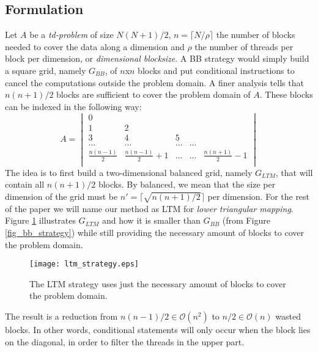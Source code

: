 \documentclass[conference]{IEEEtran}
\begin{document}
\subsection{Formulation}
\label{sec_block_mapping_function}
Let $A$ be a \textit{td-problem} of size $N(N+1)/2$,  $n = \lceil N/\rho\rceil$ the number 
of blocks needed to cover the data along a dimension and $\rho$ the number of threads per block per dimension, or 
\textit{dimensional blocksize}. 
A BB strategy would simply build a square grid, namely $G_{BB}$, of $n$x$n$ blocks and put conditional instructions to cancel the computations 
outside the problem domain. A finer analysis tells that $n(n+1)/2$ blocks are sufficient to cover the problem domain of $A$. 
These blocks can be indexed in the following way:
\begin{equation}
A = 
\begin{vmatrix}
0	&		&		&				&					\\
1	&	2	&		&				&					\\
3	&	4	&	5	&				&					\\	
...	&	... 	&	...	&	...			& 					\\
\frac{n(n-1)}{2}	&	\frac{n(n-1)}{2} + 1 	&	...	&	...	& 	\frac{n(n+1)}{2}-1\\
\end{vmatrix}
\label{eq_matrix_indexing}
\end{equation}
The idea is to first build a two-dimensional balanced grid, namely $G_{LTM}$, that will contain all $n(n+1)/2$ blocks. 
By balanced, we mean that the size per dimension of the grid must be $n' = \lceil\sqrt{n(n+1)/2}\rceil$ per dimension. 
For the rest of the paper we will name our method as LTM for \textit{lower triangular mapping}.
Figure \ref{fig_ltm_strategy} illustrates $G_{LTM}$ and how it is smaller than $G_{BB}$ (from Figure \ref{fig_bb_strategy}) 
while still providing the necessary amount of blocks to cover the problem domain.
\begin{figure}[ht!]
\centering
\texttt{[image: ltm\_strategy.eps]}
\caption{The LTM strategy uses just the necessary amount of blocks to cover the problem domain.}
\label{fig_ltm_strategy}
\end{figure}
The result is a reduction from $n(n-1)/2 \in \mathcal{O}(n^2)$ to $n/2 \in \mathcal{O}(n)$ wasted blocks. In other words, conditional 
statements will only occur when the block lies on the diagonal, in order to filter the threads in the upper part.
\end{document}
